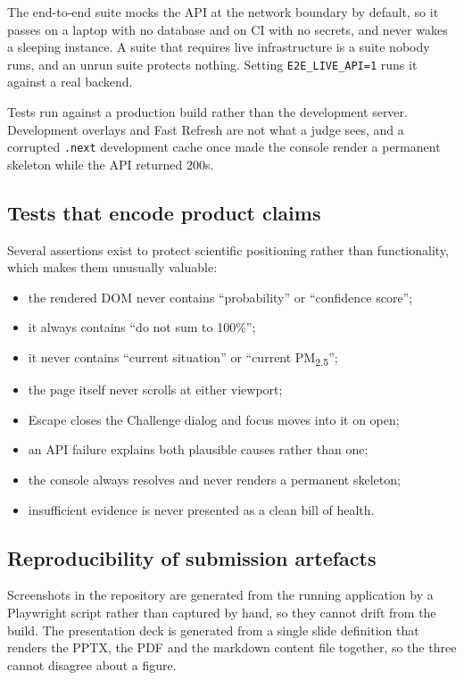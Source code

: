 \documentclass[11pt,a4paper]{article}
\newcommand{\code}[1]{\texttt{\small #1}}
\newcommand{\PM}{PM\textsubscript{2.5}}
\begin{document}
The end-to-end suite mocks the API at the network boundary by default, so it passes
on a laptop with no database and on CI with no secrets, and never wakes a sleeping
instance. A suite that requires live infrastructure is a suite nobody runs, and an
unrun suite protects nothing. Setting \code{E2E\_LIVE\_API=1} runs it against a real
backend.

Tests run against a production build rather than the development server. Development
overlays and Fast Refresh are not what a judge sees, and a corrupted \code{.next}
development cache once made the console render a permanent skeleton while the API
returned 200s.

\subsection{Tests that encode product claims}

Several assertions exist to protect scientific positioning rather than
functionality, which makes them unusually valuable:

\begin{itemize}
  \item the rendered DOM never contains ``probability'' or ``confidence score'';
  \item it always contains ``do not sum to 100\%'';
  \item it never contains ``current situation'' or ``current \PM{}'';
  \item the page itself never scrolls at either viewport;
  \item Escape closes the Challenge dialog and focus moves into it on open;
  \item an API failure explains both plausible causes rather than one;
  \item the console always resolves and never renders a permanent skeleton;
  \item insufficient evidence is never presented as a clean bill of health.
\end{itemize}

\subsection{Reproducibility of submission artefacts}

Screenshots in the repository are generated from the running application by a
Playwright script rather than captured by hand, so they cannot drift from the build.
The presentation deck is generated from a single slide definition that renders the
PPTX, the PDF and the markdown content file together, so the three cannot disagree
about a figure.
\end{document}
